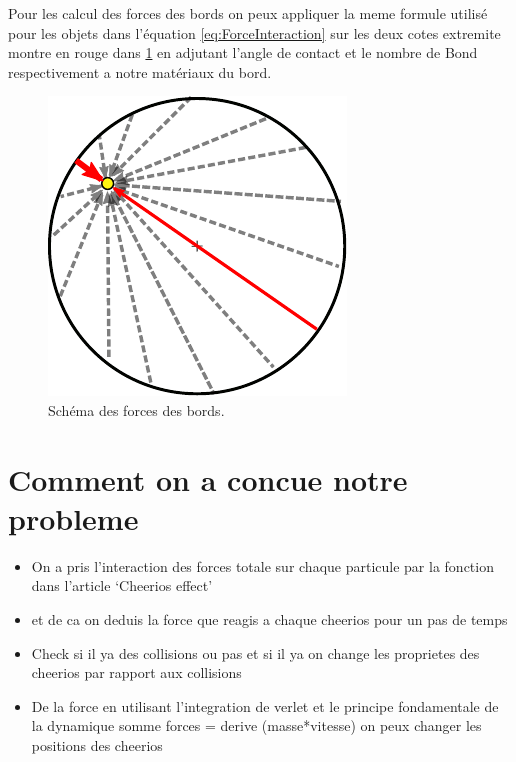 \documentclass[a4paper, 11pt, oneside]{article} %
\begin{document}
        Pour les calcul des forces des bords on peux appliquer la meme formule utilisé pour les objets dans l'équation \ref{eq:ForceInteraction} sur les deux cotes extremite montre en rouge dans \ref{fig:Force_Bord_schéma} en adjutant l'angle de contact et le nombre de Bond respectivement a notre matériaux du bord. 
        \begin{figure}[H]%
            \centering
            \includegraphics{Figure_Force_Bord.pdf}
            \caption{Schéma des forces des bords.}
            \label{fig:Force_Bord_schéma}
        \end{figure}

\section{Comment on a concue notre probleme}
    \begin{itemize}
        \item On a pris l'interaction des forces totale sur chaque particule par la fonction dans l'article `Cheerios effect'
        \item et de ca on deduis la force que reagis a chaque cheerios pour un pas de temps 
        \item Check si il ya des collisions ou pas et si il ya on change les proprietes des cheerios par rapport aux collisions
        \item De la force en utilisant l'integration de verlet et le principe fondamentale de la dynamique somme forces = derive (masse*vitesse) on peux changer les positions des cheerios
    \end{itemize}
\end{document}
